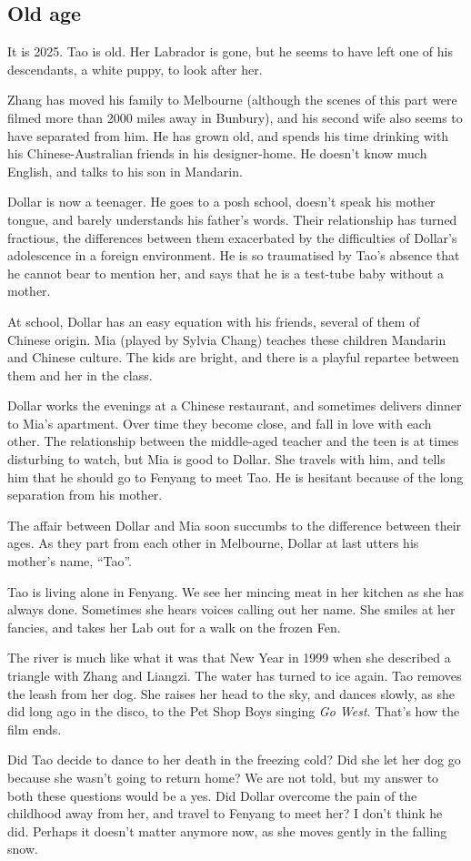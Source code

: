 \documentclass{article}
\begin{document}
\subsection{Old age}
\label{sec:7wgsj9bn}

It is 2025.  Tao is old.  Her Labrador is gone, but he seems to have
left one of his descendants, a white puppy, to look after her.

Zhang has moved his family to Melbourne (although the scenes of this
part were filmed more than 2000 miles away in Bunbury), and his second
wife also seems to have separated from him.  He has grown old, and
spends his time drinking with his Chinese-Australian friends in his
designer-home.  He doesn't know much English, and talks to his son in
Mandarin.

Dollar is now a teenager.  He goes to a posh school, doesn't speak his
mother tongue, and barely understands his father's words.  Their
relationship has turned fractious, the differences between them
exacerbated by the difficulties of Dollar's adolescence in a foreign
environment.  He is so traumatised by Tao's absence that he cannot
bear to mention her, and says that he is a test-tube baby without a
mother.

At school, Dollar has an easy equation with his friends, several of
them of Chinese origin.  Mia (played by Sylvia Chang) teaches these
children Mandarin and Chinese culture.  The kids are bright, and there
is a playful repartee between them and her in the class.

Dollar works the evenings at a Chinese restaurant, and sometimes
delivers dinner to Mia's apartment.  Over time they become close, and
fall in love with each other.  The relationship between the
middle-aged teacher and the teen is at times disturbing to watch, but
Mia is good to Dollar.  She travels with him, and tells him that he
should go to Fenyang to meet Tao.  He is hesitant because of the long
separation from his mother.

The affair between Dollar and Mia soon succumbs to the difference
between their ages.  As they part from each other in Melbourne, Dollar
at last utters his mother's name, ``Tao''.

Tao is living alone in Fenyang.  We see her mincing meat in her
kitchen as she has always done.  Sometimes she hears voices calling
out her name.  She smiles at her fancies, and takes her Lab out for a
walk on the frozen Fen.

The river is much like what it was that New Year in 1999 when she
described a triangle with Zhang and Liangzi.  The water has turned to
ice again.  Tao removes the leash from her dog.  She raises her head
to the sky, and dances slowly, as she did long ago in the disco, to
the Pet Shop Boys singing \emph{Go West}.  That's how the film ends.

Did Tao decide to dance to her death in the freezing cold? Did she let
her dog go because she wasn't going to return home?  We are not told,
but my answer to both these questions would be a yes.  Did Dollar
overcome the pain of the childhood away from her, and travel to
Fenyang to meet her?  I don't think he did.  Perhaps it doesn't matter
anymore now, as she moves gently in the falling snow.

\bibsection
\end{document}
